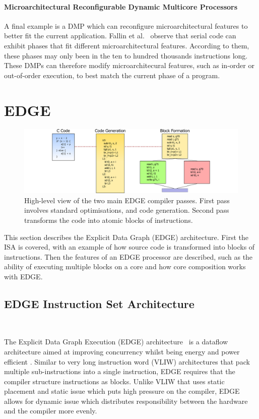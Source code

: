 \paragraph*{Microarchitectural Reconfigurable Dynamic Multicore Processors}
A final example is a DMP which can reconfigure microarchitectural features to better fit the current application.
Fallin et al.~\cite{fallinhetblock2014} observe that serial code can exhibit phases that fit different microarchitectural features.
According to them, these phases may only been in the ten to hundred thousands instructions long.
These DMPs can therefore modify microarchitecural features, such as in-order or out-of-order execution, to best match the current phase of a program.

\section{EDGE}\label{chp:bg:sec:edge}

\begin{figure}[t]
    \centering
    \includegraphics[width=1\textwidth]{background/graphics/EDGE_4.pdf}
    \caption{High-level view of the two main EDGE compiler passes. First pass involves standard optimisations, and code generation. Second pass transforms the code into atomic blocks of instructions.}
    \label{fig:EdgeHigh}
\end{figure}
This section describes the Explicit Data Graph (EDGE) architecture.
First the ISA is covered, with an example of how source code is transformed into blocks of instructions.
Then the features of an EDGE processor are described, such as the ability of executing multiple blocks on a core and how core composition works with EDGE.

\subsection{EDGE Instruction Set Architecture}~\label{sec:edge_isa}

The Explicit Data Graph Execution (EDGE) architecture~\cite{burger04edge} is a dataflow architecture aimed at improving concurrency whilst being energy and power efficient \cite{smith2006edge,burger04edge}.
Similar to very long instruction word (VLIW) architectures that pack multiple sub-instructions into a single instruction, EDGE requires that the compiler structure instructions as blocks.
Unlike VLIW that uses static placement and static issue which puts high pressure on the compiler, EDGE allows for dynamic issue which distributes responsibility between the hardware and the compiler more evenly.

